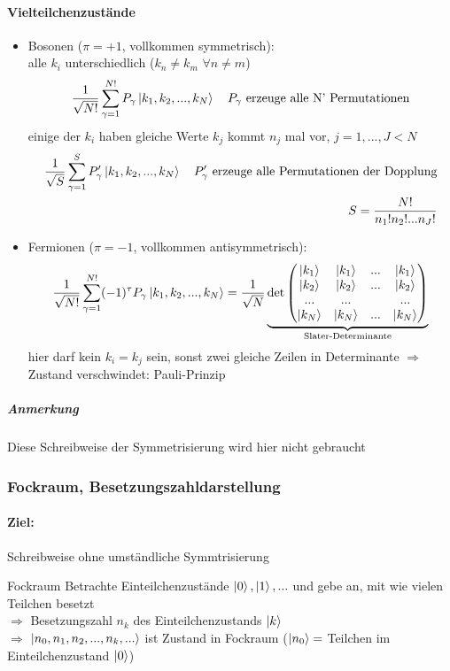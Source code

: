 \paragraph{Vielteilchenzustände}
\begin{itemize}
    \item Bosonen ($\pi = +1$, vollkommen symmetrisch):\\
    alle $k_i$ unterschiedlich ($k_n\neq k_m$ $\forall n\neq m$)
    \begin{align}
        \frac{1}{\sqrt{N!}} \sum_{\gamma =1}^{N!} P_{\gamma} \ket{k_1,k_2,...,k_N} \quad P_{\gamma}\text{ erzeuge alle N' Permutationen}
    \end{align}
    einige der $k_i$ haben gleiche Werte $k_j$ kommt $n_j$ mal vor, $j=1,...,J<N$
    \begin{align}
        \frac{1}{\sqrt{S}} \sum_{\gamma = 1}^S P'_{\gamma} \ket{k_1,k_2,...,k_N} \quad P'_{\gamma} \text{ erzeuge alle Permutationen der Dopplung}\\
        S=\frac{N!}{n_1!n_2!...n_J!}
    \end{align}
    \item Fermionen ($\pi = -1$, vollkommen antisymmetrisch):
    \begin{align}
        \frac{1}{\sqrt{N!}} \sum_{\gamma =1}^{N!} (-1)^{\tau} P_{\gamma} \ket{k_1,k_2,...,k_N} 
        =\frac{1}{\sqrt{N}} \underbrace{\det \mqty(\ket{k_1} & \ket{k_1} & ... & \ket{k_1} \\ \ket{k_2} & \ket{k_2} & ... & \ket{k_2} \\ ... & ... & &... \\ \ket{k_N} & \ket{k_N} & ... & \ket{k_N})}_{\text{Slater-Determinante}}
    \end{align}
    hier darf kein $k_i=k_j$ sein, sonst zwei gleiche Zeilen in Determinante $\Rightarrow$ Zustand verschwindet: Pauli-Prinzip
\end{itemize}
\subparagraph{Anmerkung}
Diese Schreibweise der Symmetrisierung wird hier nicht gebraucht



\subsubsection{Fockraum, Besetzungszahldarstellung} 

\paragraph{Ziel:} Schreibweise ohne umständliche Symmtrisierung
\begin{definition}{Fockraum}
    Betrachte Einteilchenzustände $\ket{0},\ket{1},...$ und gebe an, mit wie vielen Teilchen besetzt\\
    $\Rightarrow$ Besetzungszahl $n_k$ des Einteilchenzustands $\ket{k}$\\
    $\Rightarrow$ $\ket{n_0,n_1,n_2,...,n_k,...}$ ist Zustand in Fockraum ($\ket{n_0}=$ Teilchen im Einteilchenzustand $\ket{0}$)
\end{definition}


